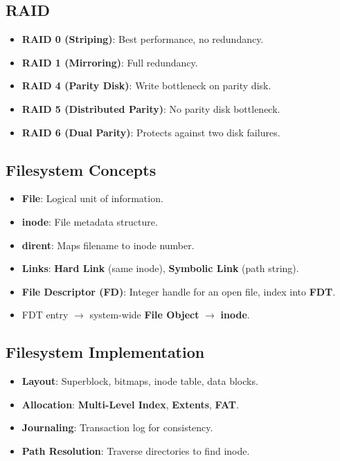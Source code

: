 \documentclass[8pt,a4paper]{article}
\begin{document}
\begin{multicols}{2}
\subsection*{RAID}
\begin{itemize}
    \item \textbf{RAID 0 (Striping)}: Best performance, no redundancy.
    \item \textbf{RAID 1 (Mirroring)}: Full redundancy.
    \item \textbf{RAID 4 (Parity Disk)}: Write bottleneck on parity disk.
    \item \textbf{RAID 5 (Distributed Parity)}: No parity disk bottleneck.
    \item \textbf{RAID 6 (Dual Parity)}: Protects against two disk failures.
\end{itemize}

\subsection*{Filesystem Concepts}
\begin{itemize}
    \item \textbf{File}: Logical unit of information.
    \item \textbf{inode}: File metadata structure.
    \item \textbf{dirent}: Maps filename to inode number.
    \item \textbf{Links}: \textbf{Hard Link} (same inode), \textbf{Symbolic Link} (path string).
    \item \textbf{File Descriptor (FD)}: Integer handle for an open file, index into \textbf{FDT}.
    \item FDT entry $\to$ system-wide \textbf{File Object} $\to$ \textbf{inode}.
\end{itemize}

\subsection*{Filesystem Implementation}
\begin{itemize}
    \item \textbf{Layout}: Superblock, bitmaps, inode table, data blocks.
    \item \textbf{Allocation}: \textbf{Multi-Level Index}, \textbf{Extents}, \textbf{FAT}.
    \item \textbf{Journaling}: Transaction log for consistency.
    \item \textbf{Path Resolution}: Traverse directories to find inode.
\end{itemize}


\end{multicols}
\end{document}

